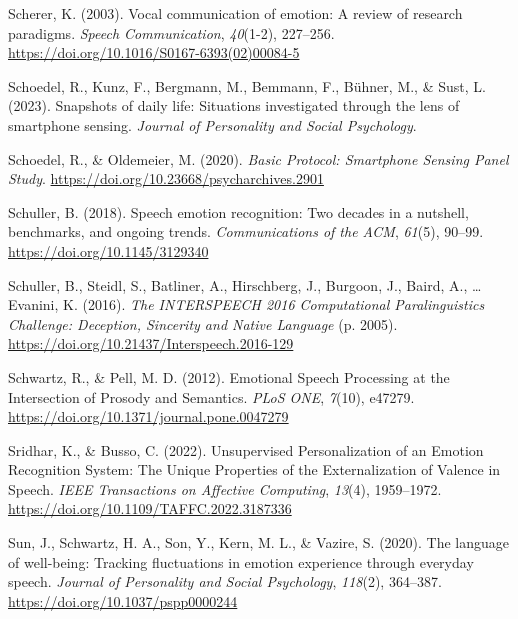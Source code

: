 \documentclass[
  english,
  man,floatsintext]{apa6}
\newlength{\cslhangindent}
\newenvironment{CSLReferences}[2] %
 {%
  \setlength{\parindent}{0pt}
  \ifodd #1 \everypar{\setlength{\hangindent}{\cslhangindent}}\ignorespaces\fi
  \ifnum #2 > 0
  \setlength{\parskip}{#2\baselineskip}
  \fi
 }%
 {}
\begin{document}
\begin{CSLReferences}{1}{0}
\leavevmode{}%
Scherer, K. (2003). Vocal communication of emotion: {A} review of research paradigms. \emph{Speech Communication}, \emph{40}(1-2), 227--256. \url{https://doi.org/10.1016/S0167-6393(02)00084-5}

\leavevmode{}%
Schoedel, R., Kunz, F., Bergmann, M., Bemmann, F., Bühner, M., \& Sust, L. (2023). Snapshots of daily life: {Situations} investigated through the lens of smartphone sensing. \emph{Journal of Personality and Social Psychology}.

\leavevmode{}%
Schoedel, R., \& Oldemeier, M. (2020). \emph{Basic {Protocol}: {Smartphone Sensing Panel Study}}. \url{https://doi.org/10.23668/psycharchives.2901}

\leavevmode{}%
Schuller, B. (2018). Speech emotion recognition: Two decades in a nutshell, benchmarks, and ongoing trends. \emph{Communications of the ACM}, \emph{61}(5), 90--99. \url{https://doi.org/10.1145/3129340}

\leavevmode{}%
Schuller, B., Steidl, S., Batliner, A., Hirschberg, J., Burgoon, J., Baird, A., \ldots{} Evanini, K. (2016). \emph{The {INTERSPEECH} 2016 {Computational Paralinguistics Challenge}: {Deception}, {Sincerity} and {Native Language}} (p. 2005). \url{https://doi.org/10.21437/Interspeech.2016-129}

\leavevmode{}%
Schwartz, R., \& Pell, M. D. (2012). Emotional {Speech Processing} at the {Intersection} of {Prosody} and {Semantics}. \emph{PLoS ONE}, \emph{7}(10), e47279. \url{https://doi.org/10.1371/journal.pone.0047279}

\leavevmode{}%
Sridhar, K., \& Busso, C. (2022). Unsupervised {Personalization} of an {Emotion Recognition System}: {The Unique Properties} of the {Externalization} of {Valence} in {Speech}. \emph{IEEE Transactions on Affective Computing}, \emph{13}(4), 1959--1972. \url{https://doi.org/10.1109/TAFFC.2022.3187336}

\leavevmode{}%
Sun, J., Schwartz, H. A., Son, Y., Kern, M. L., \& Vazire, S. (2020). The language of well-being: {Tracking} fluctuations in emotion experience through everyday speech. \emph{Journal of Personality and Social Psychology}, \emph{118}(2), 364--387. \url{https://doi.org/10.1037/pspp0000244}


\end{CSLReferences}
\end{document}
